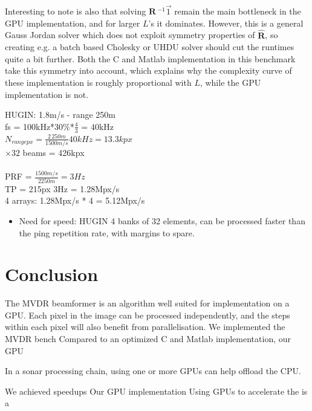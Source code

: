\documentclass[10pt,a4paper]{article}
\newcommand\mat[1]{\boldsymbol{#1}}
\newcommand\1{\vec 1}
\newcommand*\eR{\mat{\hat R}}
\newcommand*\eRi{\hat{\mat R}\,\!^{-1}}
\begin{document}
Interesting to note is also that solving $\eRi\1$ remain the main bottleneck in the \gls{GPU} implementation, and for larger $L$'s it dominates. However, this is a general Gauss Jordan solver which does not exploit symmetry properties of $\eR$, so creating e.g. a batch based Cholesky or UHDU solver should cut the runtimes quite a bit further. Both the C and Matlab implementation in this benchmark take this symmetry into account, which explains why the complexity curve of these implementation is roughly proportional with $L$, while the \gls{GPU} implementation is not.


HUGIN: 1.8m/s - range 250m \\
fs = 100kHz*30\%*$\frac{4}{3}$ = 40kHz \\
$N_{range px} = \frac{2\,250m}{1500m/s}40kHz = 13.3kpx$ \\
$\times 32$ beams = 426kpx \\\\

PRF = $\frac{1500m/s}{2 250m} = 3Hz$ \\
TP = 215px 3Hz = 1.28Mpx/s \\
4 arrays: 1.28Mpx/s * 4 = 5.12Mpx/s


\begin{itemize}
\item Need for speed: HUGIN 4 banks of 32 elements, can be processed faster than the ping repetition rate, with margins to spare.
\end{itemize}


\section{Conclusion}

The \gls{MVDR} beamformer is an algorithm well suited for implementation on a \gls{GPU}. Each pixel in the image can be processed independently, and the steps within each pixel will also benefit from parallelisation. We implemented the \gls{MVDR} bench Compared to an optimized C and Matlab implementation, our \gls{GPU}

In a sonar processing chain, using one or more \glspl{GPU} can help offload the CPU. 


We achieved speedups Our \gls{GPU} implementation 
Using \glspl{GPU} to accelerate the is a 


\end{document}
